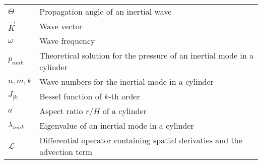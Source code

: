 \begin{longtable}[h]{p{}p{}}
  $\Theta$ & Propagation angle of an inertial wave\\

  $\vec{K}$ & Wave vector\\
  $\omega$  & Wave frequency\\

  $p_{nmk}$   & Theoretical solution for the pressure of an inertial mode in a cylinder\\
  ${n, m, k}$ & Wave numbers for the inertial mode in a cylinder\\
  $J_|k|$     & Bessel function of $k$-th order \\
  $a$         & Aspect ratio $r/H$ of a cylinder\\
  $\lambda_{nmk}$ & Eigenvalue of an inertial mode in a cylinder\\

  $\mathcal{L}$ & Differential operator containing spatial derivaties and the advection term\\


\end{longtable}
